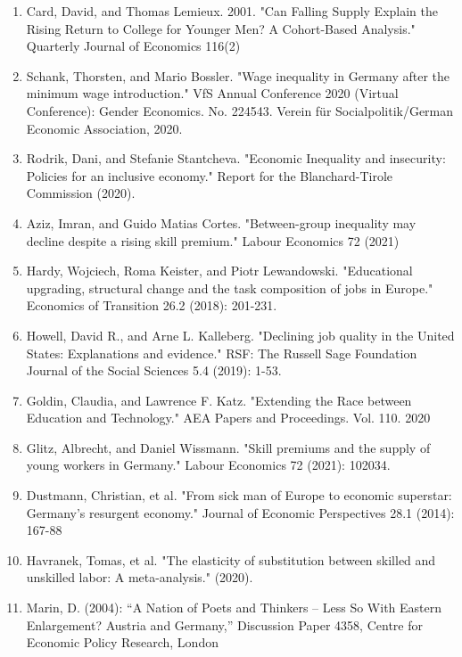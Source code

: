 \documentclass{article}
\begin{document}
\begin{enumerate}
\item Card, David, and Thomas Lemieux. 2001. "Can Falling Supply Explain the Rising Return to College for Younger Men? A Cohort-Based Analysis." Quarterly Journal of Economics 116(2)

\item Schank, Thorsten, and Mario Bossler. "Wage inequality in Germany after the minimum wage introduction." VfS Annual Conference 2020 (Virtual Conference): Gender Economics. No. 224543. Verein für Socialpolitik/German Economic Association, 2020.

\item Rodrik, Dani, and Stefanie Stantcheva. "Economic Inequality and insecurity: Policies for an inclusive economy." Report for the Blanchard-Tirole Commission (2020).

\item Aziz, Imran, and Guido Matias Cortes. "Between-group inequality may decline despite a rising skill premium." Labour Economics 72 (2021)

\item Hardy, Wojciech, Roma Keister, and Piotr Lewandowski. "Educational upgrading, structural change and the task composition of jobs in Europe." Economics of Transition 26.2 (2018): 201-231.

\item Howell, David R., and Arne L. Kalleberg. "Declining job quality in the United States: Explanations and evidence." RSF: The Russell Sage Foundation Journal of the Social Sciences 5.4 (2019): 1-53.

\item Goldin, Claudia, and Lawrence F. Katz. "Extending the Race between Education and Technology." AEA Papers and Proceedings. Vol. 110. 2020

\item Glitz, Albrecht, and Daniel Wissmann. "Skill premiums and the supply of young workers in Germany." Labour Economics 72 (2021): 102034.

\item Dustmann, Christian, et al. "From sick man of Europe to economic superstar: Germany's resurgent economy." Journal of Economic Perspectives 28.1 (2014): 167-88

\item Havranek, Tomas, et al. "The elasticity of substitution between skilled and unskilled labor: A meta-analysis." (2020).

\item Marin, D. (2004): “A Nation of Poets and Thinkers – Less So With Eastern Enlargement? Austria and Germany,” Discussion Paper 4358, Centre for Economic Policy Research, London


\end{enumerate}
\end{document}
